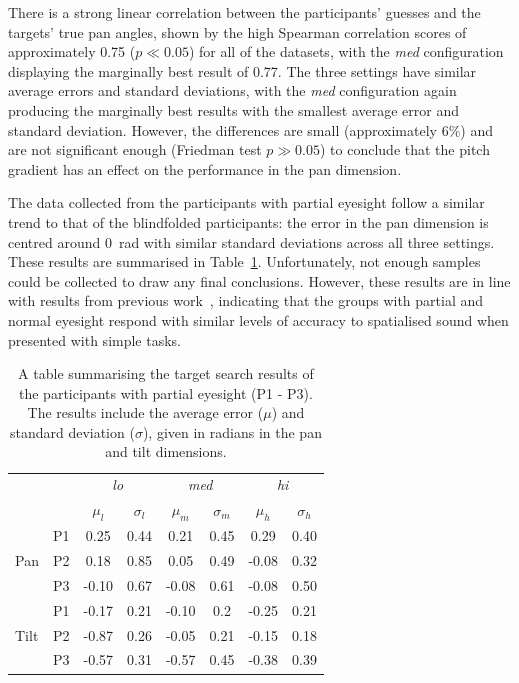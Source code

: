 \documentclass[sigconf, screen=true, anonymous=true]{acmart}
\begin{document}
There is a strong linear correlation between the participants' guesses and the targets' true pan angles, shown by the high Spearman correlation scores of approximately 0.75 ($p \ll 0.05$) for all of the datasets, with the \emph{med} configuration displaying the marginally best result of 0.77.
The three settings have similar average errors and standard deviations, with the \emph{med} configuration again producing the marginally best results with the smallest average error and standard deviation.
However, the differences are small (approximately 6\%) and are not significant enough (Friedman test $p \gg 0.05$) to conclude that the pitch gradient has an effect on the performance in the pan dimension. 

The data collected from the participants with partial eyesight follow a similar trend to that of the blindfolded participants: the error in the pan dimension is centred around \SI{0}{\radian} with similar standard deviations across all three settings.
These results are summarised in Table~\ref{tab:vi-results}.
Unfortunately, not enough samples could be collected to draw any final conclusions.
However, these results are in line with results from previous work~\cite{zwiers2001spatial}, indicating that the groups with partial and normal eyesight respond with similar levels of accuracy to spatialised sound when presented with simple tasks. 

\begin{table}
  \centering
  \caption{A table summarising the target search results of the participants with partial eyesight (P1 - P3). The results include the average error ($\mu$) and standard deviation ($\sigma$), given in radians in the pan and tilt dimensions.}\label{tab:vi-results}
  \begin{tabular}{llcccccc}
    \toprule
    \multicolumn{2}{c}{} & \multicolumn{2}{c}{\emph{lo}} & \multicolumn{2}{c}{\emph{med}} & \multicolumn{2}{c}{\emph{hi}} \\
    \multicolumn{2}{c}{} & $\mu_l$ & $\sigma_l$ & $\mu_m$ & $\sigma_m$ & $\mu_h$ & $\sigma_h$ \\\midrule
         & P1 &  0.25 & 0.44 &  0.21 & 0.45 &  0.29 & 0.40 \\%
    Pan  & P2 &  0.18 & 0.85 &  0.05 & 0.49 & -0.08 & 0.32 \\%
         & P3 & -0.10 & 0.67 & -0.08 & 0.61 & -0.08 & 0.50 \\ \midrule
         & P1 & -0.17 & 0.21 & -0.10 & 0.2  & -0.25 & 0.21 \\%
    Tilt & P2 & -0.87 & 0.26 & -0.05 & 0.21 & -0.15 & 0.18 \\%
         & P3 & -0.57 & 0.31 & -0.57 & 0.45 & -0.38 & 0.39 \\%
    \bottomrule
  \end{tabular}
\end{table}
\end{document}
